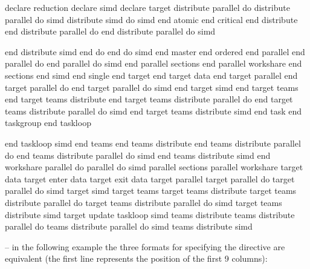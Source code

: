 \begin{indentedcodelist}
declare reduction
declare simd
declare target
distribute parallel do
distribute parallel do simd
distribute simd
do simd
end atomic
end critical
end distribute 
end distribute parallel do
end distribute parallel do simd
\end{indentedcodelist}
\pagebreak
\begin{figure}[t!]
\end{figure}
\begin{indentedcodelist}
end distribute simd
end do
end do simd
end master
end ordered
end parallel
end parallel do
end parallel do simd
end parallel sections
end parallel workshare
end sections
end simd
end single
end target
end target data
end target parallel
end target parallel do
end target parallel do simd
end target simd
end target teams
end target teams distribute
end target teams distribute parallel do
end target teams distribute parallel do simd
end target teams distribute simd
end task
end taskgroup
end taskloop
\end{indentedcodelist}
\pagebreak
\begin{figure}[t!]
\end{figure}
\begin{indentedcodelist}
end taskloop simd
end teams
end teams distribute
end teams distribute parallel do
end teams distribute parallel do simd
end teams distribute simd
end workshare
parallel do
parallel do simd
parallel sections
parallel workshare
target data
target enter data
target exit data
target parallel
target parallel do
target parallel do simd
target simd
target teams
target teams distribute
target teams distribute parallel do
target teams distribute parallel do simd
target teams distribute simd
target update
taskloop simd
teams distribute
teams distribute parallel do
teams distribute parallel do simd
teams distribute simd
\end{indentedcodelist}

\notestart
\noteheader – in the following example the three formats for specifying the directive are 
equivalent (the first line represents the position of the first 9 columns):

\begin{alltt}
\end{alltt}
\noteend
\bigskip
\fortranspecificend








